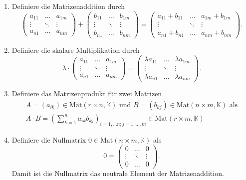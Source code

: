 \documentclass[a4paper,12pt]{article}
\begin{document}
\begin{enumerate}[label=(\alph*)]
        \item Definiere die Matrizenaddition durch
                \[ 
                        \left(\begin{matrix}
                                        a_{11}&\hdots &a_{1m}\\\vdots&\ddots&\vdots\\a_{n1}&\hdots &a_{nm}
                        \end{matrix}\right)+\left(\begin{matrix}
                                        b_{11}&\hdots &b_{1m}\\\vdots&\ddots&\vdots\\b_{n1}&\hdots &b_{nm}
                        \end{matrix}\right)=\left(\begin{matrix}
                                        a_{11}+b_{11}&\hdots &a_{1m}+b_{1m}\\\vdots&\ddots&\vdots\\a_{n1}+b_{n1}&\hdots &a_{nm}+b_{nm}
                        \end{matrix}\right)
                .\] 
        \item Definiere die skalare Multiplikation durch
                \[ 
                        \lambda \cdot \left(\begin{matrix}
                                        a_{11}&\hdots &a_{1m}\\\vdots&\ddots&\vdots\\a_{n1}&\hdots &a_{nm}
                        \end{matrix}\right)=\left(\begin{matrix}
                                        \lambda a_{11}&\hdots &\lambda a_{1m}\\\vdots&\ddots&\vdots\\\lambda a_{n1}&\hdots &\lambda a_{nm}
                        \end{matrix}\right)
                .\] 
        \item Definiere das Matrizenprodukt für zwei Matrizen
                \begin{gather*}
                        A=\left(a_{ik}\right) \in \text{Mat}\left(r\times n,\mathbb{K}\right) \text{ und }B=\left(b_{kj}\right) \in \text{Mat}\left(n\times m,\mathbb{K}\right) \text{ als}\\
                A\cdot B=\left(\sum_{k=1}^{n}a_{ik}b_{kj}\right)_{i=1,\hdots n;j=1,\hdots ,m} \in \text{Mat}\left(r\times m,\mathbb{K}\right)
                \end{gather*}
        \item Definiere die Nullmatrix $0 \in \text{Mat}\left(n\times m,\mathbb{K}\right)$ als
                \[ 
                        0=\left(\begin{matrix}
                                        0&\hdots &0\\\vdots&\ddots&\vdots\\0&\hdots &0
                        \end{matrix}\right)
                .\] 
                Damit ist die Nullmatrix das neutrale Element der Matrizenaddition.
\end{enumerate}
\end{document}
